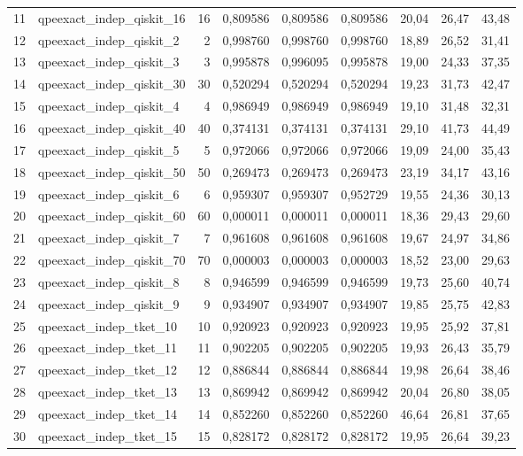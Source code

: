 \documentclass[a4paper,10pt]{article}
\begin{document}
\begin{landscape}
\begin{longtable}{r l r rrr rrr}
11 & qpeexact\_indep\_qiskit\_16 & 16 & 0,809586 & 0,809586 & 0,809586 & 20,04 & 26,47 & 43,48\\
12 & qpeexact\_indep\_qiskit\_2 & 2 & 0,998760 & 0,998760 & 0,998760 & 18,89 & 26,52 & 31,41\\
13 & qpeexact\_indep\_qiskit\_3 & 3 & 0,995878 & 0,996095 & 0,995878 & 19,00 & 24,33 & 37,35\\
14 & qpeexact\_indep\_qiskit\_30 & 30 & 0,520294 & 0,520294 & 0,520294 & 19,23 & 31,73 & 42,47\\
15 & qpeexact\_indep\_qiskit\_4 & 4 & 0,986949 & 0,986949 & 0,986949 & 19,10 & 31,48 & 32,31\\
16 & qpeexact\_indep\_qiskit\_40 & 40 & 0,374131 & 0,374131 & 0,374131 & 29,10 & 41,73 & 44,49\\
17 & qpeexact\_indep\_qiskit\_5 & 5 & 0,972066 & 0,972066 & 0,972066 & 19,09 & 24,00 & 35,43\\
18 & qpeexact\_indep\_qiskit\_50 & 50 & 0,269473 & 0,269473 & 0,269473 & 23,19 & 34,17 & 43,16\\
19 & qpeexact\_indep\_qiskit\_6 & 6 & 0,959307 & 0,959307 & 0,952729 & 19,55 & 24,36 & 30,13\\
20 & qpeexact\_indep\_qiskit\_60 & 60 & 0,000011 & 0,000011 & 0,000011 & 18,36 & 29,43 & 29,60\\
21 & qpeexact\_indep\_qiskit\_7 & 7 & 0,961608 & 0,961608 & 0,961608 & 19,67 & 24,97 & 34,86\\
22 & qpeexact\_indep\_qiskit\_70 & 70 & 0,000003 & 0,000003 & 0,000003 & 18,52 & 23,00 & 29,63\\
23 & qpeexact\_indep\_qiskit\_8 & 8 & 0,946599 & 0,946599 & 0,946599 & 19,73 & 25,60 & 40,74\\
24 & qpeexact\_indep\_qiskit\_9 & 9 & 0,934907 & 0,934907 & 0,934907 & 19,85 & 25,75 & 42,83\\
25 & qpeexact\_indep\_tket\_10 & 10 & 0,920923 & 0,920923 & 0,920923 & 19,95 & 25,92 & 37,81\\
26 & qpeexact\_indep\_tket\_11 & 11 & 0,902205 & 0,902205 & 0,902205 & 19,93 & 26,43 & 35,79\\
27 & qpeexact\_indep\_tket\_12 & 12 & 0,886844 & 0,886844 & 0,886844 & 19,98 & 26,64 & 38,46\\
28 & qpeexact\_indep\_tket\_13 & 13 & 0,869942 & 0,869942 & 0,869942 & 20,04 & 26,80 & 38,05\\
29 & qpeexact\_indep\_tket\_14 & 14 & 0,852260 & 0,852260 & 0,852260 & 46,64 & 26,81 & 37,65\\
30 & qpeexact\_indep\_tket\_15 & 15 & 0,828172 & 0,828172 & 0,828172 & 19,95 & 26,64 & 39,23\\

\end{longtable}
\end{landscape}
\end{document}
